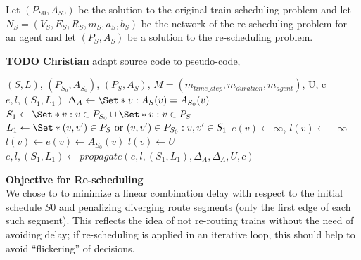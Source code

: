 \documentclass{article}
\begin{document}
Let $(P_{S0},A_{S0})$ be the solution to the original train scheduling problem
and let $N_S=(V_S,E_S,R_S,m_S,a_S,b_S)$ be the network of the re-scheduling problem for an agent
and  let $(P_S,A_S)$ be a solution to the re-scheduling problem.










\begin{mdframed}
{\bf TODO Christian } adapt source code to pseudo-code, %
\end{mdframed}



\begin{algorithm}
	\caption{$Delta_{perfect}$} \label{algo:Deltaperfect}
	\begin{algorithmic}[1]
		\Require $(S,L)$, $(P_{S_0},A_{S_0})$, $(P_S,A_S)$, $M=(m_{time\_step},m_{duration},m_{agent})$, U, c
	    \Ensure $e,l,(S_1,L_1)$
	    \State $\Delta_A \leftarrow \Set*{v: A_S(v)=A_{S_0}(v)}$
	    \State $S_1 \leftarrow \Set*{v: v\in P_{S_0}} \cup \Set*{v: v\in P_{S}}$
	    \State $L_1 \leftarrow \Set*{(v,v^\prime) \in P_S \textrm{ or } (v,v^\prime) \in P_{S_0}: v,v^\prime \in S_1}$
	        \State $e(v) \leftarrow \infty$, $l(v) \leftarrow -\infty$
	    \EndFor
	        \State $l(v)\leftarrow e(v)\leftarrow A_{S_0}(v)$
	    \EndFor
	        \State $l(v) \leftarrow U$
	    \EndFor
	    \State $e,l,(S_1,L_1) \leftarrow propagate(e,l,(S_1,L_1),\Delta_A, \Delta_A, U, c)$
	\end{algorithmic}
\end{algorithm}


\textbf{Objective for Re-scheduling}
\\
We chose to to minimize a linear combination delay with respect to the initial schedule $S0$ and penalizing diverging route segments (only the first edge of each such segment). This reflects the idea of not re-routing trains without the need of avoiding delay; if re-scheduling is applied in an iterative loop, this should help to avoid ``flickering'' of decisions.
\end{document}
